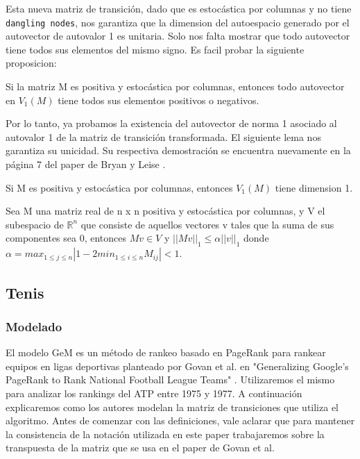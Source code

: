 Esta nueva matriz de transición, dado que es estocástica por columnas y no tiene \texttt{dangling nodes}, nos garantiza que la dimension del autoespacio generado por el autovector de autovalor 1 es unitaria. Solo nos falta mostrar que todo autovector tiene todos sus elementos del mismo signo. Es facil probar la siguiente proposicion:

\begin{proposition}
Si la matriz M es positiva y estocástica por columnas, entonces todo autovector en $V_1(M)$ tiene todos sus elementos positivos o negativos.
\end{proposition}

Por lo tanto, ya probamos la existencia del autovector de norma 1 asociado al autovalor 1 de la matriz de transición transformada. El siguiente lema nos garantiza su unicidad. Su respectiva demostración se encuentra nuevamente en la página 7 del paper de Bryan y Leise \cite{Bryan2006}.

\begin{lemma}
\item Si M es positiva y estocástica por columnas, entonces $V_1(M)$ tiene dimension 1.
\end{lemma}

\begin{proposition}
Sea M una matriz real de n x n positiva y estocástica por columnas, y V el subespacio de $\mathbb{R}^n$ que consiste de aquellos vectores v tales que la suma de sus componentes sea 0, entonces $Mv \in V$ y $||Mv||_1 \leq \alpha||v||_1$ donde $\alpha = max_{1 \leq j \leq n}|1 - 2min_{1 \leq i \leq n}M_{ij}| < 1$.
\end{proposition}

\subsection{Tenis}

\subsubsection{Modelado}

El modelo GeM es un método de rankeo basado en PageRank para rankear equipos en ligas deportivas planteado por Govan et al. en "Generalizing Google's PageRank to Rank National Football League Teams" \cite{Govan2008}. Utilizaremos el mismo para analizar los rankings del ATP entre 1975 y 1977.
A continuación explicaremos como los autores modelan la matriz de transiciones que utiliza el algoritmo. Antes de comenzar con las definiciones, vale aclarar que para mantener la consistencia de la notación utilizada en este paper trabajaremos sobre la transpuesta de la matriz que se usa en el paper de Govan et al.

